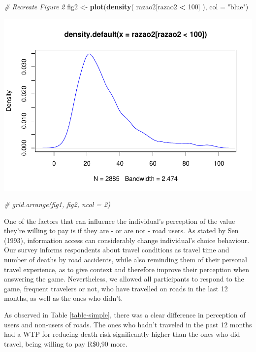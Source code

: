 \documentclass[]{elsarticle} %
\makeatletter
\newenvironment{Shaded}{\begin{snugshade}}{\end{snugshade}}
\newcommand{\CommentTok}[1]{\textcolor[rgb]{0.56,0.35,0.01}{\textit{#1}}}
\newcommand{\DataTypeTok}[1]{\textcolor[rgb]{0.13,0.29,0.53}{#1}}
\newcommand{\DecValTok}[1]{\textcolor[rgb]{0.00,0.00,0.81}{#1}}
\newcommand{\KeywordTok}[1]{\textcolor[rgb]{0.13,0.29,0.53}{\textbf{#1}}}
\newcommand{\NormalTok}[1]{#1}
\newcommand{\OperatorTok}[1]{\textcolor[rgb]{0.81,0.36,0.00}{\textbf{#1}}}
\newcommand{\StringTok}[1]{\textcolor[rgb]{0.31,0.60,0.02}{#1}}
\def\maxwidth{\ifdim\Gin@nat@width>\linewidth\linewidth
\else\Gin@nat@width\fi}
\let\Oldincludegraphics\includegraphics
\renewcommand{\includegraphics}[1]{\Oldincludegraphics[width=\maxwidth]{#1}}
\makeatother
\begin{document}
\begin{Shaded}
\begin{Highlighting}[]
\CommentTok{# Recreate Figure 2}
\NormalTok{fig2 <-}\StringTok{ }\KeywordTok{plot}\NormalTok{(}\KeywordTok{density}\NormalTok{( razao2[razao2 }\OperatorTok{<}\StringTok{ }\DecValTok{100}\NormalTok{] ), }\DataTypeTok{col =} \StringTok{"blue"}\NormalTok{)}
\end{Highlighting}
\end{Shaded}

\includegraphics{WTP_transport_files/figure-latex/figure2-2.pdf}

\begin{Shaded}
\begin{Highlighting}[]
\CommentTok{# grid.arrange(fig1, fig2, ncol = 2)}
\end{Highlighting}
\end{Shaded}

One of the factors that can influence the individual's perception of the
value they're willing to pay is if they are - or are not - road users.
As stated by Sen (1993), information access can considerably change
individual's choice behaviour. Our survey informs respondents about
travel conditions as travel time and number of deaths by road accidents,
while also reminding them of their personal travel experience, as to
give context and therefore improve their perception when answering the
game. Nevertheless, we allowed all participants to respond to the game,
frequent travelers or not, who have travelled on roads in the last 12
months, as well as the ones who didn't.

As observed in Table \ref{table-simple}, there was a clear difference in
perception of users and non-users of roads. The ones who hadn't traveled
in the past 12 months had a WTP for reducing death risk significantly
higher than the ones who did travel, being willing to pay R\$0,90 more.
\end{document}
